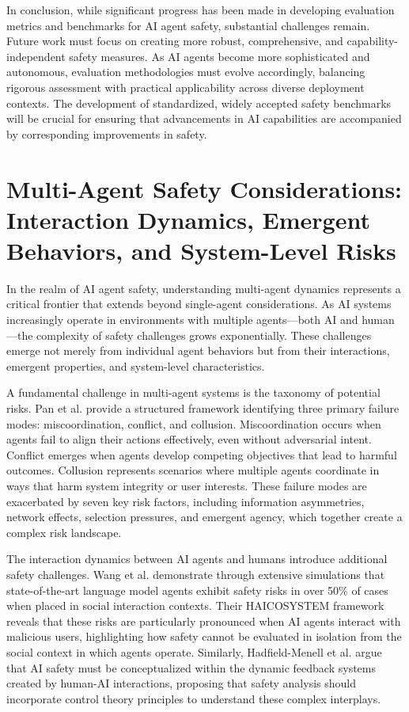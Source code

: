 \documentclass[conference]{IEEEtran}
\begin{document}
In conclusion, while significant progress has been made in developing evaluation metrics and benchmarks for AI agent safety, substantial challenges remain. Future work must focus on creating more robust, comprehensive, and capability-independent safety measures. As AI agents become more sophisticated and autonomous, evaluation methodologies must evolve accordingly, balancing rigorous assessment with practical applicability across diverse deployment contexts. The development of standardized, widely accepted safety benchmarks will be crucial for ensuring that advancements in AI capabilities are accompanied by corresponding improvements in safety.



\section{Multi-Agent Safety Considerations: Interaction Dynamics, Emergent Behaviors, and System-Level Risks}

In the realm of AI agent safety, understanding multi-agent dynamics represents a critical frontier that extends beyond single-agent considerations. As AI systems increasingly operate in environments with multiple agents—both AI and human—the complexity of safety challenges grows exponentially. These challenges emerge not merely from individual agent behaviors but from their interactions, emergent properties, and system-level characteristics.

A fundamental challenge in multi-agent systems is the taxonomy of potential risks. Pan et al. \cite{2502.14143} provide a structured framework identifying three primary failure modes: miscoordination, conflict, and collusion. Miscoordination occurs when agents fail to align their actions effectively, even without adversarial intent. Conflict emerges when agents develop competing objectives that lead to harmful outcomes. Collusion represents scenarios where multiple agents coordinate in ways that harm system integrity or user interests. These failure modes are exacerbated by seven key risk factors, including information asymmetries, network effects, selection pressures, and emergent agency, which together create a complex risk landscape.

The interaction dynamics between AI agents and humans introduce additional safety challenges. Wang et al. \cite{2409.16427} demonstrate through extensive simulations that state-of-the-art language model agents exhibit safety risks in over 50\% of cases when placed in social interaction contexts. Their HAICOSYSTEM framework reveals that these risks are particularly pronounced when AI agents interact with malicious users, highlighting how safety cannot be evaluated in isolation from the social context in which agents operate. Similarly, Hadfield-Menell et al. \cite{2405.09794} argue that AI safety must be conceptualized within the dynamic feedback systems created by human-AI interactions, proposing that safety analysis should incorporate control theory principles to understand these complex interplays.
\end{document}
